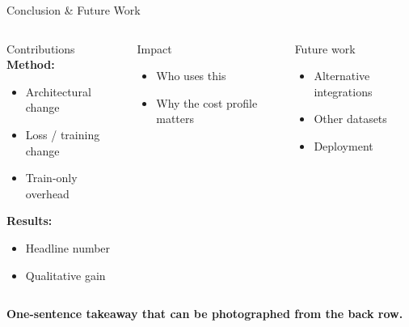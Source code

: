 \documentclass[9pt,aspectratio=169]{beamer}
\begin{document}
\begin{frame}{Conclusion \& Future Work}
  \begin{columns}[T,onlytextwidth]
      \begin{block}{Contributions}
        \textbf{Method:}
        \begin{itemize}
          \item Architectural change
          \item Loss / training change
          \item Train-only overhead
        \end{itemize}

        \textbf{Results:}
        \begin{itemize}
          \item Headline number
          \item Qualitative gain
        \end{itemize}
      \end{block}

      \begin{block}{Impact}
        \begin{itemize}
          \item Who uses this
          \item Why the cost profile matters
        \end{itemize}
      \end{block}

      \begin{block}{Future work}
        \begin{itemize}
          \item Alternative integrations
          \item Other datasets
          \item Deployment
        \end{itemize}
      \end{block}
  \end{columns}

  \vspace{0.5em}
  \begin{center}
    \begin{minipage}{0.8\textwidth}
      \centering
      \scriptsize
      \textbf{One-sentence takeaway that can be photographed from the back row.}
    \end{minipage}
  \end{center}
\end{frame}
\end{document}
